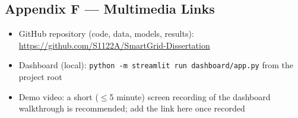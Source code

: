 \documentclass[11pt,a4paper]{article}
\begin{document}
\subsection{Appendix F --- Multimedia Links}
\begin{itemize}
\item GitHub repository (code, data, models, results):
      \url{https://github.com/S1122A/SmartGrid-Dissertation}
\item Dashboard (local): \texttt{python -m streamlit run dashboard/app.py}
      from the project root
\item Demo video: a short ($\leq$5 minute) screen recording of the dashboard
      walkthrough is recommended; add the link here once recorded
\end{itemize}

\clearpage
\nocite{*}


\end{document}
